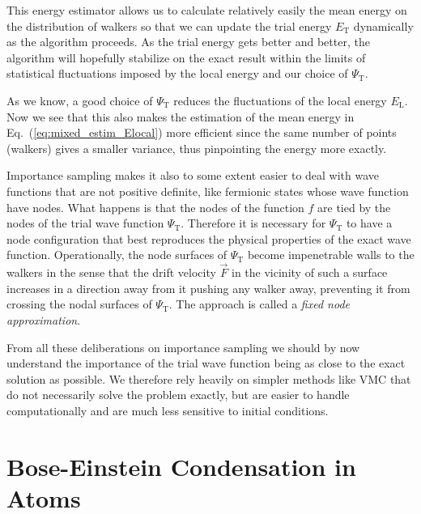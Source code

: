 This energy estimator allows us to calculate relatively easily the mean
energy on the distribution of walkers so that we can update the trial
energy $E_{\mathrm{T}}$ dynamically as the algorithm proceeds. As
the trial energy gets better and better, the algorithm will hopefully
stabilize on the exact result within the limits of statistical
fluctuations imposed by the local energy and our choice of
$\Psi_\mathrm{T}$.

As we know, a good choice of $\Psi_\mathrm{T}$ reduces the
fluctuations of the local energy $E_\mathrm{L}$. Now we see that this
also makes the estimation of the mean energy
in Eq.~(\ref{eq:mixed_estim_Elocal}) more efficient since the same
number of points (walkers) gives a smaller variance, thus pinpointing
the energy more exactly.

Importance sampling makes it also to some extent easier to deal with
wave functions that are not positive definite, like fermionic states
whose wave function have nodes. What happens is that the nodes of the
function $f$ are tied by the nodes of the trial wave function
$\Psi_\mathrm{T}$. Therefore it is necessary for $\Psi_\mathrm{T}$ to
have a node configuration that best reproduces the physical properties
of the exact wave function. Operationally, the node surfaces of
$\Psi_\mathrm{T}$ become impenetrable walls to the walkers in the
sense that the drift velocity $\vec F$ in the vicinity of such a
surface increases in a direction away from it pushing any walker away,
preventing it from crossing the nodal surfaces of $\Psi_\mathrm{T}$.
The approach is called a \emph{fixed node approximation}.

From all these deliberations on importance sampling we should by now
understand the importance of the trial wave function being as close to
the exact solution as possible. We therefore rely heavily on simpler
methods like VMC that do not necessarily solve the problem exactly,
but are easier to handle computationally and are much less sensitive
to initial conditions.



\section{Bose-Einstein Condensation in Atoms}


